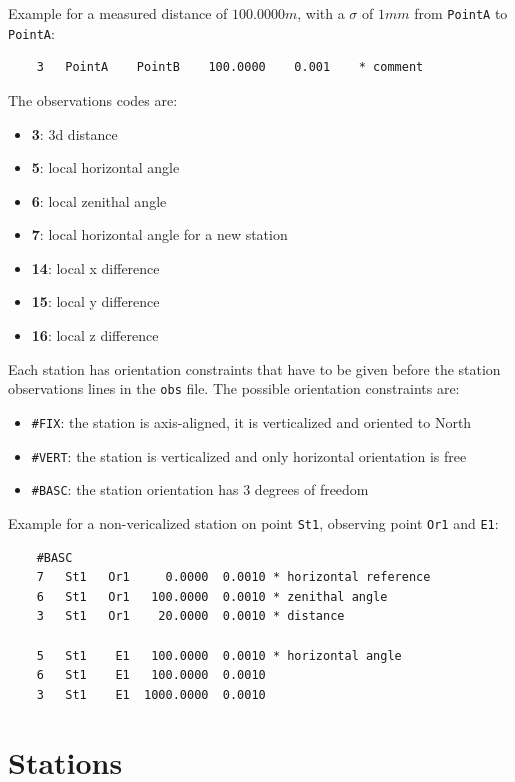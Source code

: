 Example for a measured distance of $100.0000m$, with a $\sigma$ of $1mm$ from \texttt{PointA} to \texttt{PointA}:

\begin{verbatim}
    3   PointA    PointB    100.0000    0.001    * comment
\end{verbatim}

The observations codes are:

\begin{itemize}
    \item \textbf{3}: 3d distance
    \item \textbf{5}: local horizontal angle
    \item \textbf{6}: local zenithal angle
    \item \textbf{7}: local horizontal angle for a new station 
    \item \textbf{14}: local x difference
    \item \textbf{15}: local y difference
    \item \textbf{16}: local z difference
\end{itemize}

Each station has orientation constraints that have to be given before the station observations lines in the {\tt {obs}} file.
The possible orientation constraints are:
\begin{itemize}
   \item \texttt{\#FIX}: the station is axis-aligned, it is verticalized and oriented to North
   \item \texttt{\#VERT}: the station is verticalized and only horizontal orientation is free
   \item \texttt{\#BASC}: the station orientation has 3 degrees of freedom
\end{itemize}

Example for a non-vericalized station on point \texttt{St1}, observing point \texttt{Or1} and \texttt{E1}:


\begin{verbatim}
    #BASC
    7   St1   Or1     0.0000  0.0010 * horizontal reference
    6   St1   Or1   100.0000  0.0010 * zenithal angle
    3   St1   Or1    20.0000  0.0010 * distance

    5   St1    E1   100.0000  0.0010 * horizontal angle
    6   St1    E1   100.0000  0.0010
    3   St1    E1  1000.0000  0.0010
\end{verbatim}


\section{Stations}


